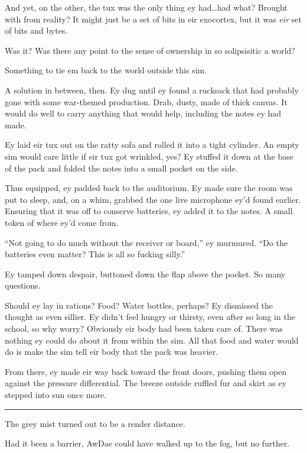 And yet, on the other, the tux was the only thing ey had\ldots{}had what? Brought with from reality? It might just be a set of bits in eir exocortex, but it was \emph{eir} set of bits and bytes.

Was it? Was there any point to the sense of ownership in so solipsisitic a world?

Something to tie em back to the world outside this sim.

A solution in between, then. Ey dug until ey found a rucksack that had probably gone with some war-themed production. Drab, dusty, made of thick canvas. It would do well to carry anything that would help, including the notes ey had made.

Ey laid eir tux out on the ratty sofa and rolled it into a tight cylinder. An empty sim would care little if eir tux got wrinkled, yes? Ey stuffed it down at the base of the pack and folded the notes into a small pocket on the side.

Thus equipped, ey padded back to the auditorium. Ey made sure the room was put to sleep, and, on a whim, grabbed the one live microphone ey'd found earlier. Ensuring that it was off to conserve batteries, ey added it to the notes. A small token of where ey'd come from.

``Not going to do much without the receiver or board,'' ey murmured. ``Do the batteries even matter? This is all so fucking silly.''

Ey tamped down despair, buttoned down the flap above the pocket. So many questions.

Should ey lay in rations? Food? Water bottles, perhaps? Ey dismissed the thought as even sillier. Ey didn't feel hungry or thirsty, even after so long in the school, so why worry? Obviously eir body had been taken care of. There was nothing ey could do about it from within the sim. All that food and water would do is make the sim tell eir body that the pack was heavier.

From there, ey made eir way back toward the front doors, pushing them open against the pressure differential. The breeze outside ruffled fur and skirt as ey stepped into sun once more.

\begin{center}\rule{0.5\linewidth}{0.5pt}\end{center}

The grey mist turned out to be a render distance.

Had it been a barrier, AwDae could have walked up to the fog, but no further.

